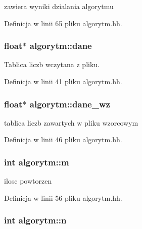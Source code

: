zawiera wyniki dzialania algorytmu 



\-Definicja w linii 65 pliku algorytm.\-hh.

\hypertarget{classalgorytm_a5dd6d510b611002cfb9737f12eeff63f}{
\subsubsection[{dane}]{\setlength{\rightskip}{0pt plus 5cm}float$\ast$ {\bf algorytm\-::dane}}}\label{classalgorytm_a5dd6d510b611002cfb9737f12eeff63f}


\-Tablica liczb wczytana z pliku. 



\-Definicja w linii 41 pliku algorytm.\-hh.

\hypertarget{classalgorytm_a93fb0f7a64eb1e4f8492445395f98e5f}{
\subsubsection[{dane\-\_\-wz}]{\setlength{\rightskip}{0pt plus 5cm}float$\ast$ {\bf algorytm\-::dane\-\_\-wz}}}\label{classalgorytm_a93fb0f7a64eb1e4f8492445395f98e5f}


tablica liczb zawartych w pliku wzorcowym 



\-Definicja w linii 46 pliku algorytm.\-hh.

\hypertarget{classalgorytm_ac9429e88b0630a008df4d011458ee5a2}{
\subsubsection[{m}]{\setlength{\rightskip}{0pt plus 5cm}int {\bf algorytm\-::m}}}\label{classalgorytm_ac9429e88b0630a008df4d011458ee5a2}


ilosc powtorzen 



\-Definicja w linii 56 pliku algorytm.\-hh.

\hypertarget{classalgorytm_a2778c37f0ec06a30b7d494501c40e91a}{
\subsubsection[{n}]{\setlength{\rightskip}{0pt plus 5cm}int {\bf algorytm\-::n}}}\label{classalgorytm_a2778c37f0ec06a30b7d494501c40e91a}


